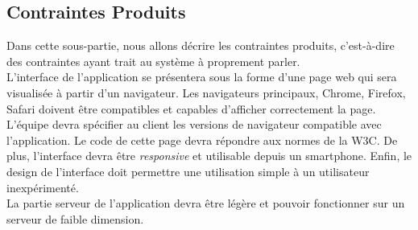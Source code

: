 
\subsection{Contraintes Produits}
Dans cette sous-partie, nous allons décrire les contraintes produits, c'est-à-dire des contraintes ayant trait au système à proprement parler.\\

L'interface de l'application se présentera sous la forme d'une page web qui sera visualisée à partir d'un navigateur. Les navigateurs principaux, Chrome, Firefox, Safari doivent être compatibles et capables d'afficher correctement la page. L'équipe \PIC{} devra spécifier au client les versions de navigateur compatible avec l'application.  Le code de cette page devra répondre aux normes de la W3C. De plus, l'interface devra être \emph{responsive} et utilisable depuis un smartphone. Enfin, le design de l'interface doit permettre une utilisation simple à un utilisateur inexpérimenté.\\

La partie serveur de l'application devra être légère et pouvoir fonctionner sur un serveur de faible dimension.\\

